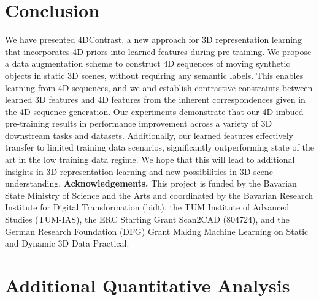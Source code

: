 \documentclass[runningheads]{llncs}
\newcommand{\OURS}{4DContrast}
\begin{document}
\section{Conclusion}

We have presented \OURS{}, a new approach for 3D representation learning that incorporates 4D priors into learned features during pre-training. 
We propose a data augmentation scheme to construct 4D sequences of moving synthetic objects in static 3D scenes, without requiring any semantic labels.
This enables learning from 4D sequences, and we and establish contrastive constraints between learned 3D features and 4D features from the inherent correspondences given in the 4D sequence generation.
Our experiments demonstrate that our 4D-imbued pre-training results in performance improvement across a variety of 3D downstream tasks and datasets.
Additionally, our learned features effectively transfer to limited training data scenarios, significantly outperforming state of the art in the low training data regime.
We hope that this will lead to additional insights in 3D representation learning and new possibilities in 3D scene understanding. 
\vspace{0.1in}
\noindent \textbf{Acknowledgements.} This project is funded by the Bavarian State Ministry of Science and the Arts and coordinated by the Bavarian Research Institute for Digital Transformation (bidt), the TUM Institute of Advanced Studies (TUM-IAS), the ERC Starting Grant Scan2CAD (804724), and the German Research Foundation (DFG) Grant Making Machine Learning on Static and Dynamic 3D Data Practical.
\clearpage



\clearpage
\appendix
\setcounter{table}{7}
\setcounter{figure}{6}


\section{Additional Quantitative Analysis}


\begin{table}[tb]
\centering
\caption{Comparisons of alternative 3D backbone and our 4D backbone on ScanNet fine-tuning.}
\vspace{-0.2cm}
        \label{table:3d-4d}
\end{table}
\end{document}
